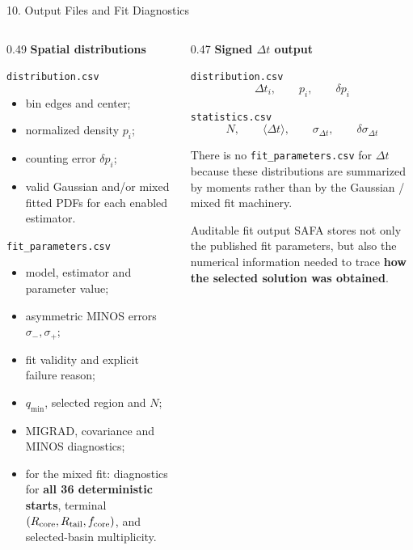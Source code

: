 \documentclass{beamer}
\begin{document}
\begin{frame}{10. Output Files and Fit Diagnostics}
\fontsize{6.15}{6.85}\selectfont

\begin{columns}[T]

\begin{column}{0.49\textwidth}
\textbf{Spatial distributions}

\texttt{distribution.csv}
\begin{itemize}
    \setlength{\itemsep}{0.12em}
    \item bin edges and center;
    \item normalized density $p_i$;
    \item counting error $\delta p_i$;
    \item valid Gaussian and/or mixed fitted PDFs for each enabled estimator.
\end{itemize}

\medskip
\texttt{fit\_parameters.csv}
\begin{itemize}
    \setlength{\itemsep}{0.12em}
    \item model, estimator and parameter value;
    \item asymmetric MINOS errors $\sigma_-,\sigma_+$;
    \item fit validity and explicit failure reason;
    \item $q_{\min}$, selected region and $N$;
    \item MIGRAD, covariance and MINOS diagnostics;
    \item for the mixed fit: diagnostics for \textbf{all 36 deterministic starts}, terminal $(R_{\rm core},R_{\rm tail},f_{\rm core})$, and selected-basin multiplicity.
\end{itemize}
\end{column}

\begin{column}{0.47\textwidth}
\textbf{Signed $\Delta t$ output}

\texttt{distribution.csv}
\[
\Delta t_i,\qquad p_i,\qquad \delta p_i
\]

\texttt{statistics.csv}
\[
N,\qquad \langle\Delta t\rangle,\qquad
\sigma_{\Delta t},\qquad \delta\sigma_{\Delta t}
\]

There is no \texttt{fit\_parameters.csv} for $\Delta t$ because these distributions are summarized by moments rather than by the Gaussian / mixed fit machinery.

\begin{alertblock}{Auditable fit output}
SAFA stores not only the published fit parameters, but also the numerical information needed to trace \textbf{how the selected solution was obtained}.
\end{alertblock}


\end{column}
\end{columns}
\end{frame}
\end{document}
